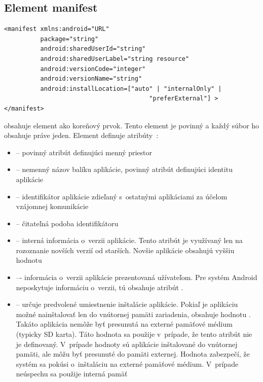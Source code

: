 \subsection{Element manifest}
\label{el_manifest}
\lstset{language=XML}
\begin{lstlisting}
<manifest xmlns:android="URL"
          package="string"
          android:sharedUserId="string"
          android:sharedUserLabel="string resource"
          android:versionCode="integer"
          android:versionName="string"
          android:installLocation=["auto" | "internalOnly" |
                                        "preferExternal"] >
</manifest>
\end{lstlisting}
 obsahuje element  ako koreňový prvok. Tento element je povinný a každý súbor  ho obsahuje práve jeden. \newline\newline
\noindent Element  definuje atribúty~\cite{elManifest}:\\
\begin{itemize}
\item {} -- povinný atribút definujúci menný priestor
\item {} -- nemenný názov balíku aplikácie, povinný atribút definujúci identitu aplikácie
\item {} -- identifikátor aplikácie zdieľaný s~ostatnými aplikáciami za účelom vzájomnej komunikácie
\item {} -- čitateľná podoba  identifikátoru
\item {} -- interná informácia o~verzii aplikácie. Tento atribút je využívaný len na rozoznanie novších verzií od starších. Novšie aplikácie obsahujú vyššiu hodnotu
\item {} –- informácia o~verzii aplikácie prezentovaná užívateľom. Pre systém Android neposkytuje informáciu o~verzii, tú obsahuje atribút .
\item {} – určuje predvolené umiestnenie inštalácie aplikácie. Pokiaľ je aplikáciu možné nainštalovať len do vnútornej pamäti zariadenia, obsahuje hodnotu . Takáto aplikácia nemôže byť presunutá na externé pamäťové médium (typicky SD karta). Táto hodnota sa použije v~prípade, že tento atribút nie je definovaný. V~prípade hodnoty  sú aplikácie inštalované do vnútornej pamäti, ale môžu byť presunuté do pamäti externej. Hodnota  zabezpečí, že systém sa pokúsi o~inštaláciu na externé pamäťové médium. V~prípade neúspechu sa použije interná pamäť
\end{itemize}

